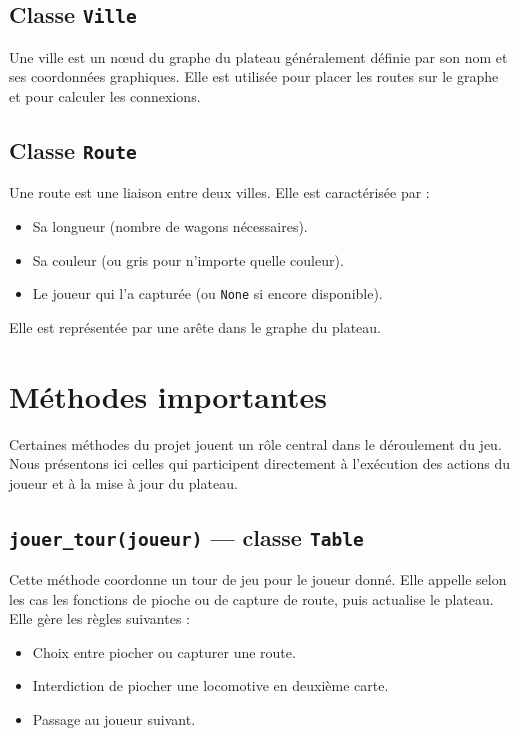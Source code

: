 \documentclass[a4paper,12pt]{report}
\begin{document}
\subsection*{Classe \texttt{Ville}}

Une ville est un nœud du graphe du plateau généralement définie par son nom et ses coordonnées graphiques.
Elle est utilisée pour placer les routes sur le graphe et pour calculer les connexions.

\subsection*{Classe \texttt{Route}}

Une route est une liaison entre deux villes. Elle est caractérisée par :
\begin{itemize}
    \item Sa longueur (nombre de wagons nécessaires).
    \item Sa couleur (ou gris pour n’importe quelle couleur).
    \item Le joueur qui l’a capturée (ou \texttt{None} si encore disponible).
\end{itemize}
Elle est représentée par une arête dans le graphe du plateau.


\section{Méthodes importantes}

Certaines méthodes du projet jouent un rôle central dans le déroulement du jeu.
Nous présentons ici celles qui participent directement à l'exécution des actions du joueur et à la mise à jour du plateau.

\subsection*{\texttt{jouer\_tour(joueur)} — classe \texttt{Table}}

Cette méthode coordonne un tour de jeu pour le joueur donné.
Elle appelle selon les cas les fonctions de pioche ou de capture de route, puis actualise le plateau.
Elle gère les règles suivantes :
\begin{itemize}
    \item Choix entre piocher ou capturer une route.
    \item Interdiction de piocher une locomotive en deuxième carte.
    \item Passage au joueur suivant.
\end{itemize}
\end{document}
